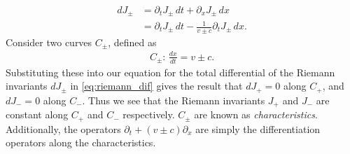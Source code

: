 \begin{align}
    d J_\pm &= \partial_t J_\pm \, dt + \partial_x J_\pm \, dx \\
    &= \partial_t J_\pm \, dt - \frac{1}{v \pm c} \partial_t J_\pm \, dx. \label{eq:riemann_dif}
\end{align}
Consider two curves $C_\pm$, defined as 
\begin{align}
    C_\pm: \, \frac{dx}{dt} = v \pm c.
\end{align}
Substituting these into our equation for the total differential of the Riemann invariants $dJ_\pm$ in \ref{eq:riemann_dif} gives the result that $dJ_+ = 0$ along $C_+$, and $dJ_- = 0$ along $C_-$.
Thus we see that the Riemann invariants $J_+$ and $J_-$ are constant along $C_+$ and $C_-$ respectively.
$C_\pm$ are known as \textit{characteristics}.
Additionally, the operators $\partial_t + (v \pm c)\partial_x$ are simply the differentiation operators along the characteristics.